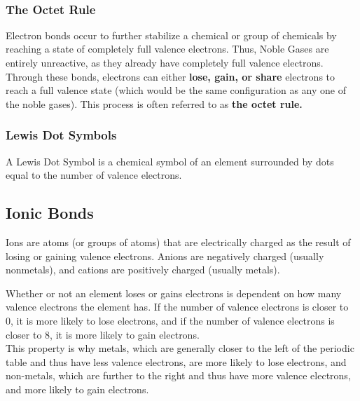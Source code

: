 \noindent
{} \\

\subsubsection{The Octet Rule}

Electron bonds occur to further stabilize a chemical or group of chemicals by reaching a state of completely full valence electrons. Thus, Noble Gases are entirely unreactive, as they already have completely full valence electrons. Through these bonds, electrons can either \textbf{lose, gain, or share} electrons to reach a full valence state (which would be the same configuration as any one of the noble gases). This process is often referred to as \textbf{the octet rule.}

\subsubsection{Lewis Dot Symbols}

\begin{defn}
A Lewis Dot Symbol is a chemical symbol of an element surrounded by dots equal to the number of valence electrons.
\end{defn}

\noindent
{}

\subsection{Ionic Bonds}

\begin{defn}
Ions are atoms (or groups of atoms) that are electrically charged as the result of losing or gaining valence electrons. Anions are negatively charged (usually nonmetals), and cations are positively charged (usually metals).
\end{defn}

\noindent
Whether or not an element loses or gains electrons is dependent on how many valence electrons the element has. If the number of valence electrons is closer to 0, it is more likely to lose electrons, and if the number of valence electrons is closer to 8, it is more likely to gain electrons.  \\

\noindent
This property is why metals, which are generally closer to the left of the periodic table and thus have less valence electrons, are more likely to lose electrons, and non-metals, which are further to the right and thus have more valence electrons, and more likely to gain electrons. \\

